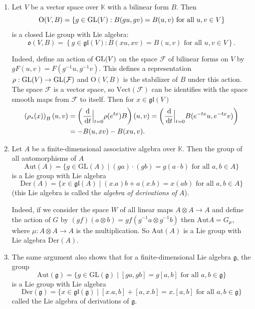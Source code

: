 \documentclass{report}
\begin{document}
\begin{example}
    \begin{enumerate}[label = (\roman*)]
        \item 
        Let $V$ be a vector space over $\mathbb K$ with a bilinear form $B$.
        Then
        \[
        \mathrm{O}(V, B) = \left\{ g \in \operatorname{{\mathrm{GL}}}(V) : B(gu, gv) = B(u,v) \text{ for all } u, v \in V \right\}
        \]
        is a closed Lie group with Lie algebra:
        \[
        \mathfrak{o}(V,B) = \left\{ g \in \mathfrak{gl}(V): B(xu, xv) = B(u,v) \text{ for all } u,v \in V\right\}.
        \]
    
        Indeed, define an action of $\operatorname{{\mathrm{GL}}}(V)$ on the space $\mathcal F$ of bilinear forms on $V$ by $gF(u,v) = F(g^{-1}u, g^{-1}v)$.
        This defines a representation $\rho: \operatorname{{\mathrm{GL}}}(V) \to \operatorname{{\mathrm{GL}}}(\mathcal F)$ and $\mathrm{O}(V,B)$ is the stabilizer of $B$ under this action.
        The space $\mathcal F$ is a vector space, so $\mathrm{Vect}(\mathcal F)$ can be identifies with the space smooth maps from $\mathcal F$ to itself.
        Then for $x \in \mathfrak{gl}(V)$
        \begin{align*}
            \left(\rho_*(x)\right)_B(u,v) &= \left( \frac{\,\mathrm{d}}{\,\mathrm{d} t}\Big|_{t=0} \rho(e^{tx}) B\right)(u, v) = \left( \frac{\,\mathrm{d}}{\,\mathrm{d} t}\Big|_{t=0} B(e^{-tx}u, e^{-tx}v)\right)\\
            &= -B(u, xv) - B(xu, v).
        \end{align*}
    
        \item 
        Let $A$ be a finite-dimensional associative algebra over $\mathbb{K}$. Then the group of all automorphisms of $A$
        \[
        \text{Aut}(A) = \{g \in \text{GL}(A) \mid (g a) \cdot (g b) = g(a \cdot b) \text{ for all } a,b \in A\}
        \]
        is a Lie group with Lie algebra
        \[
        \text{Der}(A) = \{x \in \mathfrak{gl}(A) \mid (x.a)b + a(x.b) = x(ab) \text{ for all } a, b \in A\}
        \]
        (this Lie algebra is called the \textit{algebra of derivations of} $A$).
        
        Indeed, if we consider the space $W$ of all linear maps $A \otimes A \to A$ and define the action of $G$ by $(g f)(a \otimes b) = g f(g^{-1}a \otimes g^{-1}b)$ then $\text{Aut} A = G_\mu$, where $\mu : A \otimes A \to A$ is the multiplication. So $\text{Aut}(A)$ is a Lie group with Lie algebra $\text{Der}(A)$.
        \item 
        The same argument also shows that for a finite-dimensional Lie algebra $\mathfrak{g}$, the group
        \[
        \text{Aut}(\mathfrak{g}) = \{ g \in \text{GL}(\mathfrak{g}) \mid [ga, gb] = g[a, b] \text{ for all } a, b \in \mathfrak{g} \}
        \]
        is a Lie group with Lie algebra
        \[
        \text{Der}(\mathfrak{g}) = \{ x \in \mathfrak{gl}(\mathfrak{g}) \mid [x.a, b] + [a, x.b] = x.[a, b] \text{ for all } a, b \in \mathfrak{g} \}
        \]
        called the Lie algebra of derivations of $\mathfrak{g}$.
    \end{enumerate}
\end{example}
\end{document}

